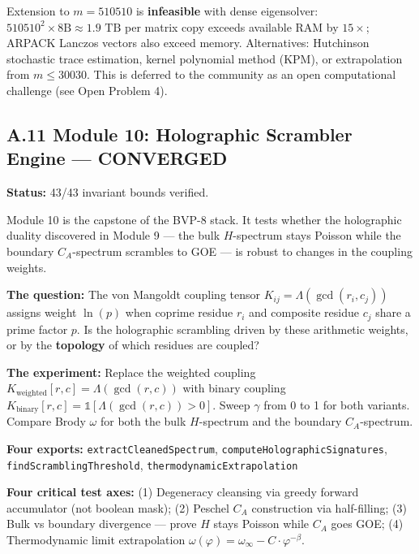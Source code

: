 \documentclass[
  11pt,
]{article}
\numberwithin{equation}{section}
\begin{document}
Extension to \(m = 510510\) is \textbf{infeasible} with dense
eigensolver: \(510510^2 \times 8\text{B} \approx 1.9\text{ TB}\) per
matrix copy exceeds available RAM by \(15\times\); ARPACK Lanczos
vectors also exceed memory. Alternatives: Hutchinson stochastic trace
estimation, kernel polynomial method (KPM), or extrapolation from
\(m \leq 30030\). This is deferred to the community as an open
computational challenge (see Open Problem 4).

\subsection{\texorpdfstring{A.11 Module 10: Holographic Scrambler
Engine ---
\textbf{CONVERGED}}{A.11 Module 10: Holographic Scrambler Engine --- CONVERGED}}\label{a.11-module-10-holographic-scrambler-engine-converged}

\textbf{Status:} 43/43 invariant bounds verified.

Module 10 is the capstone of the BVP-8 stack. It tests whether the
holographic duality discovered in Module 9 --- the bulk \(H\)-spectrum
stays Poisson while the boundary \(C_A\)-spectrum scrambles to GOE ---
is robust to changes in the coupling weights.

\textbf{The question:} The von Mangoldt coupling tensor
\(K_{ij} = \Lambda(\gcd(r_i, c_j))\) assigns weight \(\ln(p)\) when
coprime residue \(r_i\) and composite residue \(c_j\) share a prime
factor \(p\). Is the holographic scrambling driven by these arithmetic
weights, or by the \textbf{topology} of which residues are coupled?

\textbf{The experiment:} Replace the weighted coupling
\(K_{\text{weighted}}[r,c] = \Lambda(\gcd(r,c))\) with binary coupling
\(K_{\text{binary}}[r,c] = \mathbb{1}[\Lambda(\gcd(r,c)) > 0]\). Sweep
\(\gamma\) from 0 to 1 for both variants. Compare Brody \(\omega\) for
both the bulk \(H\)-spectrum and the boundary \(C_A\)-spectrum.

\textbf{Four exports:} \texttt{extractCleanedSpectrum},
\texttt{computeHolographicSignatures}, \texttt{findScramblingThreshold},
\texttt{thermodynamicExtrapolation}

\textbf{Four critical test axes:} (1) Degeneracy cleansing via greedy
forward accumulator (not boolean mask); (2) Peschel \(C_A\) construction
via half-filling; (3) Bulk vs boundary divergence --- prove \(H\) stays
Poisson while \(C_A\) goes GOE; (4) Thermodynamic limit extrapolation
\(\omega(\varphi) = \omega_\infty - C \cdot \varphi^{-\beta}\).
\end{document}
